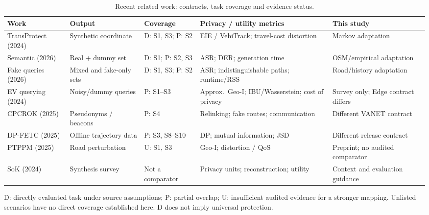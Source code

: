 \begin{table}[t]\centering\footnotesize
\caption{Recent related work: contracts, task coverage and evidence status.}\label{tab:related}
\begin{tabularx}{\linewidth}{@{}P{2.5cm}P{2.05cm}P{2.15cm}YP{2.35cm}@{}}\toprule
\textbf{Work} & \textbf{Output} & \textbf{Coverage} & \textbf{Privacy / utility metrics} & \textbf{This study} \\
\midrule
TransProtect (2024)\cite{transprotect} & Synthetic coordinate & D: S1, S3; P: S2 & EIE / VehiTrack; travel-cost distortion & Markov adaptation \\
Semantic (2026)\cite{semantic} & Real + dummy set & D: S1; P: S2, S3 & ASR; DER; generation time & OSM/empirical adaptation \\
Fake queries (2026)\cite{fake} & Mixed and fake-only sets & D: S1, S3; P: S2 & ASR; indistinguishable paths; runtime/RSS & Road/history adaptation \\
EV querying (2024)\cite{ev} & Noisy/dummy queries & P: S1--S3 & Approx.\ Geo-I; IBU/Wasserstein; cost of privacy & Survey only; Edge contract differs \\
CPCROK (2025)\cite{cpcrok} & Pseudonyms / beacons & P: S4 & Relinking; fake routes; communication & Different VANET contract \\
DP-FETC (2025)\cite{dpfetc} & Offline trajectory data & P: S3, S8--S10 & DP; mutual information; JSD & Different release contract \\
PTPPM (2025)\cite{ptppm} & Road perturbation & U: S1, S3 & Geo-I; distortion / QoS & Preprint; no audited comparator \\
SoK (2024)\cite{sok} & Synthesis survey & Not a comparator & Privacy units; reconstruction; utility & Context and evaluation guidance \\
\bottomrule\end{tabularx}
\par\smallskip\raggedright D: directly evaluated task under source assumptions; P: partial overlap; U: insufficient audited evidence for a stronger mapping. Unlisted scenarios have no direct coverage established here. D does not imply universal protection.
\end{table}
